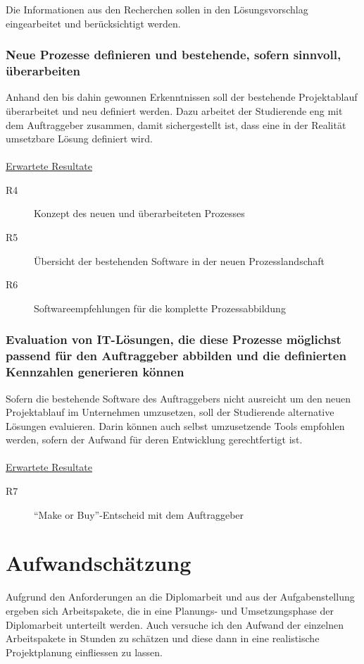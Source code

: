 Die Informationen aus den Recherchen sollen in den Lösungsvorschlag eingearbeitet
und berücksichtigt werden.

\subsubsection{Neue Prozesse definieren und bestehende, sofern sinnvoll, überarbeiten}
Anhand den bis dahin gewonnen Erkenntnissen soll der bestehende Projektablauf
überarbeitet und neu definiert werden. Dazu arbeitet der Studierende eng mit
dem Auftraggeber zusammen, damit sichergestellt ist, dass eine in der Realität
umsetzbare Lösung definiert wird.
\\\\
\underline{Erwartete Resultate}

\begin{description}
    \item[R4] Konzept des neuen und überarbeiteten Prozesses
    \item[R5] Übersicht der bestehenden Software in der neuen Prozesslandschaft
    \item[R6] Softwareempfehlungen für die komplette Prozessabbildung
\end{description}

\subsubsection{Evaluation von IT-Lösungen, die diese Prozesse möglichst passend 
    für den Auftraggeber abbilden und die definierten Kennzahlen generieren können}
Sofern die bestehende Software des Auftraggebers nicht ausreicht um den neuen
Projektablauf im Unternehmen umzusetzen, soll der Studierende alternative 
Lösungen evaluieren. Darin können auch selbst umzusetzende Tools empfohlen 
werden, sofern der Aufwand für deren Entwicklung gerechtfertigt ist.
\\\\
\underline{Erwartete Resultate}

\begin{description}
    \item[R7] ``Make or Buy''-Entscheid mit dem Auftraggeber
\end{description}

\section{Aufwandschätzung}
Aufgrund den Anforderungen an die Diplomarbeit und aus der Aufgabenstellung
ergeben sich Arbeitspakete, die in eine Planungs- und Umsetzungsphase
der Diplomarbeit unterteilt werden. Auch versuche ich den Aufwand der einzelnen
Arbeitspakete in Stunden zu schätzen und diese dann in eine realistische 
Projektplanung einfliessen zu lassen.


